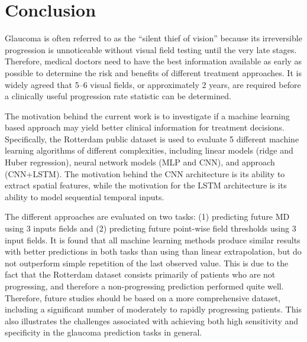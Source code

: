 \chapter{Conclusion}

Glaucoma is often referred to as the ``silent thief of vision'' because its irreversible progression is unnoticeable without visual field testing until the very late stages. Therefore, medical doctors need to have the best information available as early as possible to determine the risk and benefits of different treatment approaches. It is widely agreed that 5--6 visual fields, or approximately 2 years, are required before a clinically useful progression rate statistic can be determined. 

The motivation behind the current work is to investigate if a machine learning based approach may yield better clinical information for treatment decisions. Specifically, the Rotterdam public dataset is used to evaluate 5 different machine learning algorithms of different complexities, including linear models (ridge and Huber regression), neural network models (\ac{MLP} and \ac{CNN}), and  approach (\acs{CNN}+\acs{LSTM}). The motivation behind the \ac{CNN} architecture is its ability to extract spatial features, while the motivation for the \ac{LSTM} architecture is its ability to model sequential temporal inputs. 

The different approaches are evaluated on two tasks: (1) predicting future \ac{MD} using 3 inputs fields and (2) predicting future point-wise field thresholds using 3 input fields. It is found that all machine learning methods produce similar results with better predictions in both tasks than using than linear extrapolation, but do not outperform simple repetition of the last observed value. This is due to the fact that the Rotterdam dataset consists primarily of patients who are not progressing, and therefore a non-progressing prediction performed quite well. Therefore, future studies should be based on a more comprehensive dataset, including a significant number of moderately to rapidly progressing patients. This also illustrates the challenges associated with achieving both high sensitivity and specificity in the glaucoma prediction tasks in general. 
